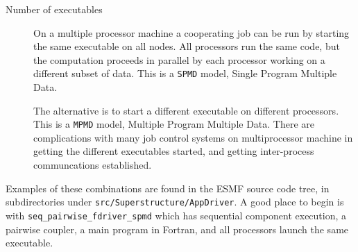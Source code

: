 \begin{description}
\item[Number of executables]

On a multiple processor machine a cooperating job can be run 
by starting the same executable on all nodes.  All processors run the
same code, but the computation proceeds in parallel by each processor 
working on a different subset of data.  This is a {\tt SPMD} model, 
Single Program Multiple Data.  

The alternative is to start a different executable on different
processors.  This is a {\tt MPMD} model, Multiple Program Multiple Data.
There are complications with many job control systems on multiprocessor
machine in getting the different executables started, and getting
inter-process communcations established.

\end{description}


Examples of these combinations are found in the ESMF source code tree, in
subdirectories under {\tt src/Superstructure/AppDriver}.
A good place to begin is with
{\tt seq\_pairwise\_fdriver\_spmd} which
has sequential component execution, a pairwise coupler, a main program
in Fortran, and all processors launch the same executable.

